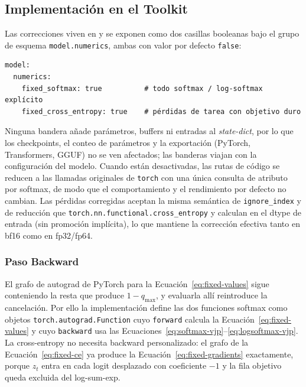 \subsection{Implementación en el Toolkit}
\label{sec:fixed-implementation}

Las correcciones viven en  y se exponen como dos casillas booleanas bajo el grupo de esquema \texttt{model.numerics}, ambas con valor por defecto \texttt{false}:

\begin{verbatim}
model:
  numerics:
    fixed_softmax: true          # todo softmax / log-softmax explícito
    fixed_cross_entropy: true    # pérdidas de tarea con objetivo duro
\end{verbatim}

Ninguna bandera añade parámetros, buffers ni entradas al \emph{state-dict}, por lo que los checkpoints, el conteo de parámetros y la exportación (PyTorch, Transformers, GGUF) no se ven afectados; las banderas viajan con la configuración del modelo. Cuando están desactivadas, las rutas de código se reducen a las llamadas originales de \texttt{torch} con una única consulta de atributo por softmax, de modo que el comportamiento y el rendimiento por defecto no cambian. Las pérdidas corregidas aceptan la misma semántica de \texttt{ignore\_index} y de reducción que \texttt{torch.nn.functional.cross\_entropy} y calculan en el dtype de entrada (sin promoción implícita), lo que mantiene la corrección efectiva tanto en bf16 como en fp32/fp64.

\subsubsection{Paso Backward}

El grafo de autograd de PyTorch para la Ecuación~\ref{eq:fixed-values} sigue conteniendo la resta que produce $1 - q_{\max}$, y evaluarla allí reintroduce la cancelación. Por ello la implementación define las dos funciones softmax como objetos \texttt{torch.autograd.Function} cuyo \texttt{forward} calcula la Ecuación~\ref{eq:fixed-values} y cuyo \texttt{backward} usa las Ecuaciones~\ref{eq:softmax-vjp}--\ref{eq:logsoftmax-vjp}. La cross-entropy no necesita backward personalizado: el grafo de la Ecuación~\ref{eq:fixed-ce} ya produce la Ecuación~\ref{eq:fixed-gradients} exactamente, porque $z_t$ entra en cada logit desplazado con coeficiente $-1$ y la fila objetivo queda excluida del log-sum-exp.

